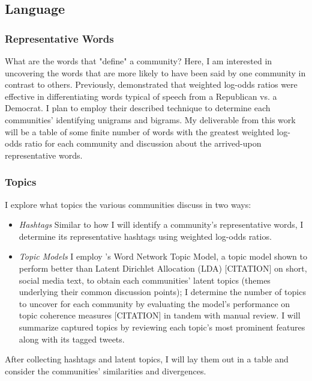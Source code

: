 \documentclass[acmlarge, screen, authorversion]{acmart}
\begin{document}
\subsection{Language}

\subsubsection{Representative Words} 

What are the words that "define" a community? Here, I am interested in uncovering the words that are more likely to have been said by one community in contrast to others. Previously, \citet{monroeFightinWordsLexical2008} demonstrated that weighted log-odds ratios were effective in differentiating words typical of speech from a Republican vs. a Democrat. I plan to employ their described technique to determine each communities' identifying unigrams and bigrams. My deliverable from this work will be a table of some finite number of words with the greatest weighted log-odds ratio for each community and discussion about the arrived-upon representative words.

\subsubsection{Topics}

I explore what topics the various communities discuss in two ways:

\begin{itemize}
    \item \textit{Hashtags} Similar to how I will identify a community's representative words, I determine its representative hashtags using weighted log-odds ratios. 
    
    \item \textit{Topic Models} I employ \citet{zuoWordNetworkTopic2016}'s Word Network Topic Model, a topic model shown to perform better than Latent Dirichlet Allocation (LDA) [CITATION] on short, social media text, to obtain each communities' latent topics (themes underlying their common discussion points); I determine the number of topics to uncover for each community by evaluating the model's performance on topic coherence measures [CITATION] in tandem with manual review. I will summarize captured topics by reviewing each topic's most prominent features along with its tagged tweets.
    
\end{itemize}

After collecting hashtags and latent topics, I will lay them out in a table and consider the communities' similarities and divergences.
\end{document}
